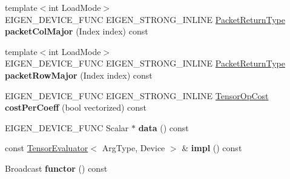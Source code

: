 \begin{DoxyCompactItemize}
{\footnotesize template$<$int Load\+Mode$>$ }\\E\+I\+G\+E\+N\+\_\+\+D\+E\+V\+I\+C\+E\+\_\+\+F\+U\+NC E\+I\+G\+E\+N\+\_\+\+S\+T\+R\+O\+N\+G\+\_\+\+I\+N\+L\+I\+NE \hyperlink{group___sparse_core___module}{Packet\+Return\+Type} {\bfseries packet\+Col\+Major} (Index index) const
\item 
\mbox{\label{struct_eigen_1_1_tensor_evaluator_3_01const_01_tensor_broadcasting_op_3_01_broadcast_00_01_arg_type_01_4_00_01_device_01_4_a5130b87c59b3dee4237f20b9dc8ea8be}} 
{\footnotesize template$<$int Load\+Mode$>$ }\\E\+I\+G\+E\+N\+\_\+\+D\+E\+V\+I\+C\+E\+\_\+\+F\+U\+NC E\+I\+G\+E\+N\+\_\+\+S\+T\+R\+O\+N\+G\+\_\+\+I\+N\+L\+I\+NE \hyperlink{group___sparse_core___module}{Packet\+Return\+Type} {\bfseries packet\+Row\+Major} (Index index) const
\item 
\mbox{\label{struct_eigen_1_1_tensor_evaluator_3_01const_01_tensor_broadcasting_op_3_01_broadcast_00_01_arg_type_01_4_00_01_device_01_4_a459c02c70e44b4fcf69ec188746e7c2b}} 
E\+I\+G\+E\+N\+\_\+\+D\+E\+V\+I\+C\+E\+\_\+\+F\+U\+NC E\+I\+G\+E\+N\+\_\+\+S\+T\+R\+O\+N\+G\+\_\+\+I\+N\+L\+I\+NE \hyperlink{class_eigen_1_1_tensor_op_cost}{Tensor\+Op\+Cost} {\bfseries cost\+Per\+Coeff} (bool vectorized) const
\item 
\mbox{\label{struct_eigen_1_1_tensor_evaluator_3_01const_01_tensor_broadcasting_op_3_01_broadcast_00_01_arg_type_01_4_00_01_device_01_4_aa1866318e35438aff7efba404add1b1a}} 
E\+I\+G\+E\+N\+\_\+\+D\+E\+V\+I\+C\+E\+\_\+\+F\+U\+NC Scalar $\ast$ {\bfseries data} () const
\item 
\mbox{\label{struct_eigen_1_1_tensor_evaluator_3_01const_01_tensor_broadcasting_op_3_01_broadcast_00_01_arg_type_01_4_00_01_device_01_4_acbd0b63fd911b2a64f5b40edf33d07f6}} 
const \hyperlink{struct_eigen_1_1_tensor_evaluator}{Tensor\+Evaluator}$<$ Arg\+Type, Device $>$ \& {\bfseries impl} () const
\item 
\mbox{\label{struct_eigen_1_1_tensor_evaluator_3_01const_01_tensor_broadcasting_op_3_01_broadcast_00_01_arg_type_01_4_00_01_device_01_4_ad44dac700a2c282e1f193335725bec80}} 
Broadcast {\bfseries functor} () const
\end{DoxyCompactItemize}
